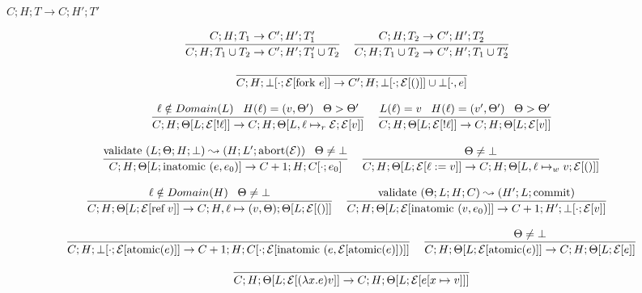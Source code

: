 \documentclass[9pt]{article}
\newcommand{\eval}[1]{\mathcal{E}[#1]}
\newcommand{\ctxt}[0]{\mathcal{E}}
\newcommand{\loc}[0]{\ell}
\newcommand{\atomic}[1]{\text{atomic}(#1)}
\newcommand{\alloc}[1]{\text{ref} \; #1}
\newcommand{\commit}[0]{\text{commit}}
\newcommand{\abort}[1]{\text{abort}(#1)}
\newcommand{\fork}[1]{\text{fork } #1}
\newcommand{\inatomic}[1]{\text{inatomic }(#1)}
\newcommand{\validate}[1]{\text{validate }(#1)}
\begin{document}
$\boxed{C; H; T \rightarrow C; H' ;T'}$

\[%
\infer[]{C; H; T_1 \cup T_2 \rightarrow C'; H'; T_1' \cup T_2}{C; H; T_1 \rightarrow C'; H'; T_1'} \;\;\;
\infer[]{C; H; T_1 \cup T_2 \rightarrow C'; H'; T_1 \cup T_2'}{C; H; T_2 \rightarrow C'; H'; T_2'} \;\;\; 
\]

\[%
\infer[]{C; H; \bot[\cdot; \eval{\fork{e}}] \rightarrow C'; H; \bot[\cdot; \eval{()}] \cup \bot[\cdot, e]}{}
\]

\[%
\infer[]{C; H; \Theta[L; \eval{!\loc}] \rightarrow C; H; \Theta[L, \loc \mapsto_r \ctxt; \eval{v}]}{\loc \notin Domain(L) \;\;\; H(\loc) = (v, \Theta') \;\;\; \Theta > \Theta'}  \;\;\;
\infer[]{C; H; \Theta[L; \eval{!\loc}] \rightarrow C; H; \Theta[L; \eval{v}]}{L(\loc) = v \;\;\; H(\loc) = (v', \Theta') \;\;\; \Theta > \Theta'} 
\]

\[%
\infer[]{C; H; \Theta[L; \inatomic{e, e_0}] \rightarrow C+1; H; C[\cdot; e_0]}{\validate{L; \Theta; H; \bot} \leadsto (H; L'; \abort{\ctxt}) \;\;\; \Theta \neq \bot} \;\;\;
\infer[]{C; H; \Theta[L; \eval{\loc := v}] \rightarrow C; H; \Theta[L, \loc \mapsto_w v; \eval{()}]}{\Theta \neq \bot} 
\]

\[%
\infer[]{C; H; \Theta[L; \eval{\alloc{v}}] \rightarrow C; H, \loc \mapsto (v, \Theta); \Theta[L;  \eval{()}]}{\loc \notin Domain(H) \;\;\; \Theta \neq \bot} \;\;\;
\infer[]{C; H; \Theta[L; \eval{\inatomic{v, e_0}}] \rightarrow C+1; H'; \bot[\cdot; \eval{v}]}{\validate{\Theta; L; H; C} \leadsto (H'; L; \commit)} \;\;\;
\]

\[
\infer[]{C; H; \bot[\cdot; \eval{\atomic{e}}] \rightarrow C+1; H; C[\cdot; \eval{\inatomic{e, \eval{\atomic{e}}}}]}{} \;\;\;
\infer[]{C; H; \Theta[L; \eval{\atomic{e}}] \rightarrow C; H; \Theta[L; \eval{e}]}{\Theta \neq \bot}
\]

\[
\infer[]{C; H; \Theta[L; \eval{(\lambda x. e) v}] \rightarrow C; H; \Theta[L; \eval{e[x\mapsto v]}]}{}
\]


\endgroup
\end{document}
